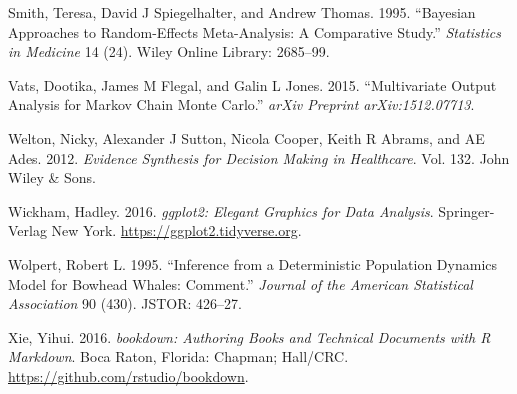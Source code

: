 \documentclass[11pt,]{book}
\begin{document}
\hypertarget{ref-smith1995bayesian}{}
Smith, Teresa, David J Spiegelhalter, and Andrew Thomas. 1995.
``Bayesian Approaches to Random-Effects Meta-Analysis: A Comparative
Study.'' \emph{Statistics in Medicine} 14 (24). Wiley Online Library:
2685--99.

\hypertarget{ref-vats2015multivariate}{}
Vats, Dootika, James M Flegal, and Galin L Jones. 2015. ``Multivariate
Output Analysis for Markov Chain Monte Carlo.'' \emph{arXiv Preprint
arXiv:1512.07713}.

\hypertarget{ref-welton2012evidence}{}
Welton, Nicky, Alexander J Sutton, Nicola Cooper, Keith R Abrams, and AE
Ades. 2012. \emph{Evidence Synthesis for Decision Making in Healthcare}.
Vol. 132. John Wiley \& Sons.

\hypertarget{ref-ggplot2}{}
Wickham, Hadley. 2016. \emph{ggplot2: Elegant Graphics for Data
Analysis}. Springer-Verlag New York.
\url{https://ggplot2.tidyverse.org}.

\hypertarget{ref-wolpert1995inference}{}
Wolpert, Robert L. 1995. ``Inference from a Deterministic Population
Dynamics Model for Bowhead Whales: Comment.'' \emph{Journal of the
American Statistical Association} 90 (430). JSTOR: 426--27.

\hypertarget{ref-bookdown}{}
Xie, Yihui. 2016. \emph{bookdown: Authoring Books and Technical
Documents with R Markdown}. Boca Raton, Florida: Chapman; Hall/CRC.
\url{https://github.com/rstudio/bookdown}.
\end{document}
